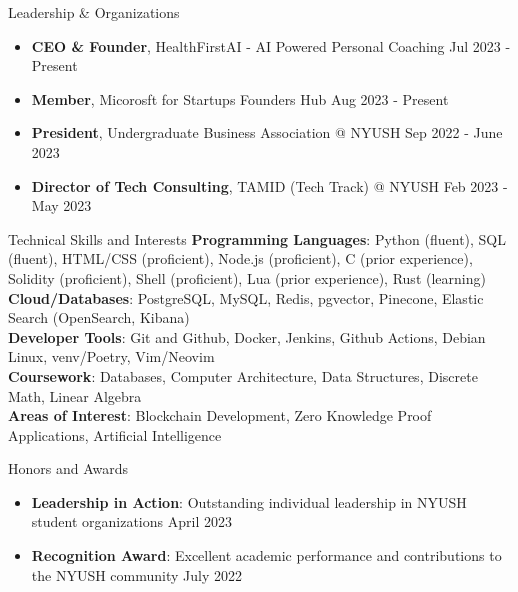 \documentclass{resume} %
\begin{document}
\begin{rSection}{Leadership \& Organizations}
	\begin{itemize}
		\item \textbf{CEO \& Founder}{, HealthFirstAI - AI Powered Personal Coaching} \hfill Jul 2023 - Present
		\item \textbf{Member}{, Micorosft for Startups Founders Hub} \hfill Aug 2023 - Present
		\item \textbf{President}{, Undergraduate Business Association @ NYUSH} \hfill Sep 2022 - June 2023
		\item \textbf{Director of Tech Consulting}{, TAMID (Tech Track) @ NYUSH} \hfill Feb 2023 - May 2023
	\end{itemize}
\end{rSection}


\begin{rSection}{Technical Skills and Interests}
	\textbf{Programming Languages}{: Python (fluent), SQL (fluent), HTML/CSS (proficient), Node.js (proficient), C (prior experience), Solidity (proficient), Shell  (proficient), Lua (prior experience), Rust (learning)} \\
	\textbf{Cloud/Databases}{: PostgreSQL, MySQL, Redis, pgvector, Pinecone, Elastic Search (OpenSearch, Kibana)} \\
	\textbf{Developer Tools}{: Git and Github, Docker, Jenkins, Github Actions, Debian Linux, venv/Poetry, Vim/Neovim} \\
	\textbf{Coursework}{: Databases, Computer Architecture, Data Structures, Discrete Math, Linear Algebra} \\
	\textbf{Areas of Interest}{: Blockchain Development, Zero Knowledge Proof Applications, Artificial Intelligence}
\end{rSection}


\begin{rSection}{Honors and Awards}
	\begin{itemize}
		\item \textbf{Leadership in Action}{: Outstanding individual leadership in NYUSH student organizations} \hfill April 2023
		\item \textbf{Recognition Award}{: Excellent academic performance and contributions to the NYUSH community} \hfill July 2022
	\end{itemize}
\end{rSection}
\end{document}
